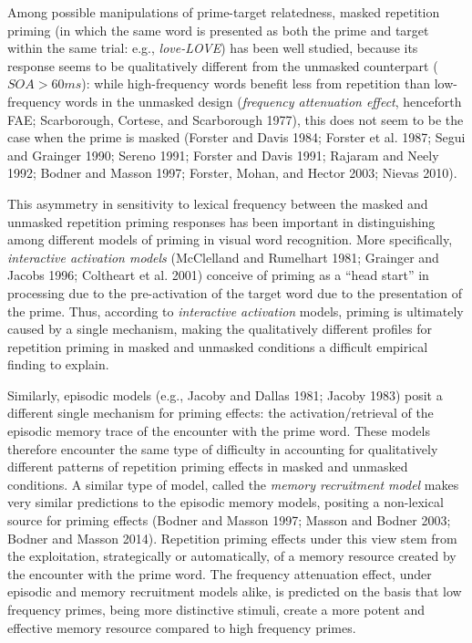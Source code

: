 \documentclass[
]{interact}
\begin{document}
Among possible manipulations of prime-target relatedness, masked
repetition priming (in which the same word is presented as both the
prime and target within the same trial: e.g., \emph{love-LOVE}) has been
well studied, because its response seems to be qualitatively different
from the unmasked counterpart (\(SOA > 60 ms\)): while high-frequency
words benefit less from repetition than low-frequency words in the
unmasked design (\emph{frequency attenuation effect}, henceforth FAE;
Scarborough, Cortese, and Scarborough 1977), this does not seem to be
the case when the prime is masked (Forster and Davis 1984; Forster et
al. 1987; Segui and Grainger 1990; Sereno 1991; Forster and Davis 1991;
Rajaram and Neely 1992; Bodner and Masson 1997; Forster, Mohan, and
Hector 2003; Nievas 2010).

This asymmetry in sensitivity to lexical frequency between the masked
and unmasked repetition priming responses has been important in
distinguishing among different models of priming in visual word
recognition. More specifically, \emph{interactive activation models}
(McClelland and Rumelhart 1981; Grainger and Jacobs 1996; Coltheart et
al. 2001) conceive of priming as a ``head start'' in processing due to
the pre-activation of the target word due to the presentation of the
prime. Thus, according to \emph{interactive activation} models, priming
is ultimately caused by a single mechanism, making the qualitatively
different profiles for repetition priming in masked and unmasked
conditions a difficult empirical finding to explain.

Similarly, episodic models (e.g., Jacoby and Dallas 1981; Jacoby 1983)
posit a different single mechanism for priming effects: the
activation/retrieval of the episodic memory trace of the encounter with
the prime word. These models therefore encounter the same type of
difficulty in accounting for qualitatively different patterns of
repetition priming effects in masked and unmasked conditions. A similar
type of model, called the \emph{memory recruitment model} makes very
similar predictions to the episodic memory models, positing a
non-lexical source for priming effects (Bodner and Masson 1997; Masson
and Bodner 2003; Bodner and Masson 2014). Repetition priming effects
under this view stem from the exploitation, strategically or
automatically, of a memory resource created by the encounter with the
prime word. The frequency attenuation effect, under episodic and memory
recruitment models alike, is predicted on the basis that low frequency
primes, being more distinctive stimuli, create a more potent and
effective memory resource compared to high frequency primes.
\end{document}
